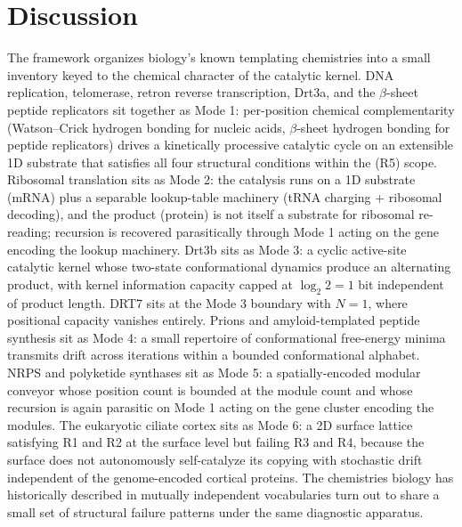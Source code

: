 \documentclass[aps,prx,reprint,amsmath,amssymb,floatfix,superscriptaddress,nofootinbib]{revtex4-2}
\theoremstyle{plain-thm}
\theoremstyle{definition-thm}
\begin{document}
\section{Discussion}

The framework organizes biology's known templating chemistries into a small inventory keyed to the chemical character of the catalytic kernel. DNA replication, telomerase, retron reverse transcription, Drt3a, and the $\beta$-sheet peptide replicators \citep{Greenwald2016} sit together as Mode 1: per-position chemical complementarity (Watson--Crick hydrogen bonding for nucleic acids, $\beta$-sheet hydrogen bonding for peptide replicators) drives a kinetically processive catalytic cycle on an extensible 1D substrate that satisfies all four structural conditions within the (R5) scope. Ribosomal translation sits as Mode 2: the catalysis runs on a 1D substrate (mRNA) plus a separable lookup-table machinery (tRNA charging + ribosomal decoding), and the product (protein) is not itself a substrate for ribosomal re-reading; recursion is recovered parasitically through Mode 1 acting on the gene encoding the lookup machinery. Drt3b sits as Mode 3: a cyclic active-site catalytic kernel whose two-state conformational dynamics produce an alternating product, with kernel information capacity capped at $\log_2 2 = 1$ bit independent of product length. DRT7 sits at the Mode 3 boundary with $N = 1$, where positional capacity vanishes entirely. Prions and amyloid-templated peptide synthesis sit as Mode 4: a small repertoire of conformational free-energy minima transmits drift across iterations within a bounded conformational alphabet. NRPS and polyketide synthases sit as Mode 5: a spatially-encoded modular conveyor whose position count is bounded at the module count and whose recursion is again parasitic on Mode 1 acting on the gene cluster encoding the modules. The eukaryotic ciliate cortex sits as Mode 6: a 2D surface lattice satisfying R1 and R2 at the surface level but failing R3 and R4, because the surface does not autonomously self-catalyze its copying with stochastic drift independent of the genome-encoded cortical proteins. The chemistries biology has historically described in mutually independent vocabularies turn out to share a small set of structural failure patterns under the same diagnostic apparatus.
\end{document}
